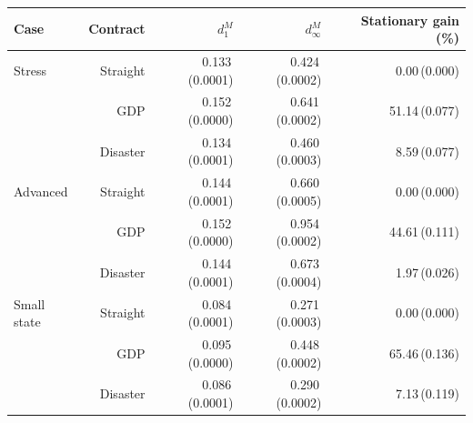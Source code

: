 \begin{tabular}{@{}lrrrr@{}}
\toprule
Case & Contract & $d_1^M$ & $d_\infty^M$ & Stationary gain (\%) \\ \midrule
Stress & Straight & 0.133\,(0.0001) & 0.424\,(0.0002) & 0.00\,(0.000) \\
 & GDP & 0.152\,(0.0000) & 0.641\,(0.0002) & 51.14\,(0.077) \\
 & Disaster & 0.134\,(0.0001) & 0.460\,(0.0003) & 8.59\,(0.077) \\
Advanced & Straight & 0.144\,(0.0001) & 0.660\,(0.0005) & 0.00\,(0.000) \\
 & GDP & 0.152\,(0.0000) & 0.954\,(0.0002) & 44.61\,(0.111) \\
 & Disaster & 0.144\,(0.0001) & 0.673\,(0.0004) & 1.97\,(0.026) \\
Small state & Straight & 0.084\,(0.0001) & 0.271\,(0.0003) & 0.00\,(0.000) \\
 & GDP & 0.095\,(0.0000) & 0.448\,(0.0002) & 65.46\,(0.136) \\
 & Disaster & 0.086\,(0.0001) & 0.290\,(0.0002) & 7.13\,(0.119) \\
\bottomrule
\end{tabular}
